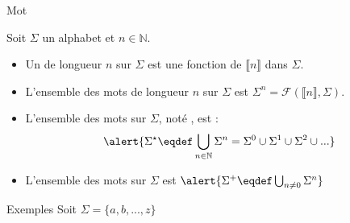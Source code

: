 
\begingroup

\begin{frame}{Mot}

  Soit $\Sigma$ un alphabet et $n\in \mathbb{N}$.
  \begin{itemize}
  \item Un  de longueur $n$ sur $\Sigma$ est une \alert{fonction de $\llbracket n\rrbracket$ dans $\Sigma$}.
  \item L'ensemble des mots de longueur $n$ sur $\Sigma$ est \alert{$\Sigma^n = \mathscr{F}\left(\llbracket n\rrbracket, \Sigma\right)$}.
  \item L'ensemble des mots sur $\Sigma$, noté \structure{$\Sigma^\star$}, est :
    $$\alert{\displaystyle \Sigma^\star \eqdef \bigcup_{n\in \mathbb{N}} \Sigma^n = \Sigma^0 \cup \Sigma^1 \cup \Sigma^2 \cup ...}$$
  \item L'ensemble des mots  sur $\Sigma$ est
    $\alert{\Sigma^+ \eqdef \bigcup_{n \neq 0 } \Sigma^n}$
  \end{itemize}

  \begin{exampleblock}{Exemples}
    Soit $\Sigma = \{a, b, ..., z\}$


\end{exampleblock}
\end{frame}
